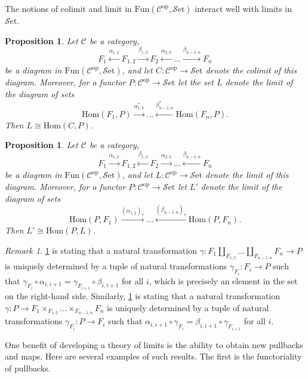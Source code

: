 \documentclass[11pt, a4paper]{amsart}
\newcommand{\cC}{\mathcal{C}}
\newcommand{\Hom}{\mathrm{Hom}}
\newcommand{\op}{\mathrm{op}}
\newcommand{\Fun}{\mathrm{Fun}}
\newcommand{\Set}{\mathscr{S}\mathrm{et}}
\newtheorem{proposition}[equation]{Proposition}
\theoremstyle{definition}
\theoremstyle{remark}
\newtheorem{remark}[equation]{Remark}
\numberwithin{equation}{section}
\begin{document}
The notions of colimit and limit in $\Fun(\cC^{\op},\Set)$ interact well with limits in $\Set$.

\begin{proposition} \label{prop:colimit limit}
  Let $\cC$ be a category, 
  \[F_1 \xleftarrow{\alpha_{1,2}} F_{1,2} \xrightarrow{\beta_{1,2}} F_{2} \xleftarrow{\alpha_{2,3}}  ... \xrightarrow{\beta_{n-1,n}} F_n\] 
  be a diagram in $\Fun(\cC^{\op},\Set)$, and let $C\colon \cC^{\op} \to \Set$ denote the colimit of this diagram. Moreover, for a functor  $P\colon \cC^{\op} \to \Set$ let the set $L$ denote the limit of the diagram of sets 
  \[\Hom(F_1,P) \xrightarrow{\alpha_{1,2}^*} ... \xleftarrow{\beta_{n-1,n}^*} \Hom(F_n,P).\] 
  Then $L \cong \Hom(C,P)$. 
\end{proposition}

\begin{proposition} \label{prop:limit limit}
  Let $\cC$ be a category,
  \[F_1 \xrightarrow{\alpha_{1,2}} F_{1,2} \xleftarrow{\beta_{1,2}} F_{2} \xrightarrow{\alpha_{2,3}}  ... \xleftarrow{\beta_{n-1,n}} F_n\] 
  be a diagram in $\Fun(\cC^{\op},\Set)$, and let $L\colon \cC^{\op} \to \Set$ denote the limit of this diagram. Moreover, for a functor  $P\colon \cC^{\op} \to \Set$ let $L'$ denote the limit of the diagram of sets 
  \[\Hom(P,F_1) \xrightarrow{(\alpha_{1,2})_*} ... \xleftarrow{(\beta_{n-1,n})_*} \Hom(P,F_n).\] 
  Then $L' \cong \Hom(P,L)$.  
\end{proposition}

\begin{remark} \label{rem:colimit limit}
  \cref{prop:colimit limit} is stating that a natural transformation $\gamma \colon F_1 \coprod_{F_{1,2}} ... \coprod_{F_{n-1,n}} F_n \to P$ is uniquely determined by a tuple of natural transformations $\gamma_{F_i}\colon F_i \to P$ such that $\gamma_{F_i} \circ \alpha_{i,i+1} = \gamma_{F_{i+1}} \circ \beta_{i,i+1}$ for all $i$, which is precisely an element in the set on the right-hand side. Similarly, \cref{prop:limit limit} is stating that a natural transformation $\gamma\colon P \to F_1 \times_{F_{1,2}} ... \times_{F_{n-1,n}} F_n $ is uniquely determined by a tuple of natural transformations $\gamma_{F_i}\colon P \to F_i$ such that $\alpha_{i,i+1} \circ \gamma_{F_i} = \beta_{i,i+1} \circ \gamma_{F_{i+1}}$ for all $i$.
\end{remark}

One benefit of developing a theory of limits is the ability to obtain new pullbacks and maps. Here are several examples of such results. The first is the functoriality of pullbacks.
\end{document}
